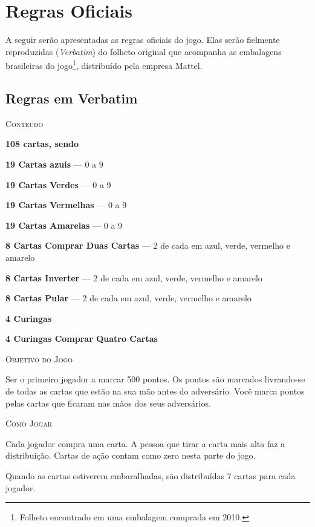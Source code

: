 \chapter{Regras Oficiais}
\label{oficiais}

A seguir serão apresentadas as regras oficiais do jogo. Elas serão fielmente reproduzidas (\textit{Verbatim}) do folheto original que acompanha as embalagens brasileiras do jogo\footnote{Folheto encontrado em uma embalagem comprada em 2010.}, distribuído pela empresa Mattel.

\section{Regras em Verbatim}

\vspace{0.5cm}

\textsc{\large{Conteúdo}}

\textbf{108 cartas, sendo}

\textbf{19 Cartas azuis} --- 0 a 9

\textbf{19 Cartas Verdes} --- 0 a 9

\textbf{19 Cartas Vermelhas} --- 0 a 9

\textbf{19 Cartas Amarelas} --- 0 a 9

\textbf{8 Cartas Comprar Duas Cartas} --- 2 de cada em azul, verde, vermelho e amarelo

\textbf{8 Cartas Inverter} --- 2 de cada em azul, verde, vermelho e amarelo

\textbf{8 Cartas Pular} --- 2 de cada em azul, verde, vermelho e amarelo

\textbf{4 Curingas}

\textbf{4 Curingas Comprar Quatro Cartas}

\vspace{0.5cm}

\textsc{\large{Objetivo do Jogo}}

Ser o primeiro jogador a marcar 500 pontos. Os pontos são marcados livrando-se de todas as cartas que estão na sua mão antes do adversário. Você marca pontos pelas cartas que ficaram nas mãos dos seus adversários.

\textsc{\large{Como Jogar}}

Cada jogador compra uma carta. A pessoa que tirar a carta mais alta faz a distribuição. Cartas de ação contam como zero nesta parte do jogo.

Quando as cartas estiverem embaralhadas, são distribuídas 7 cartas para cada jogador.

